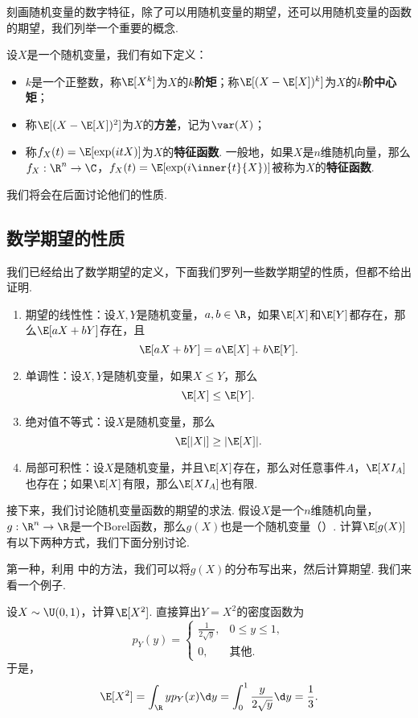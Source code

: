 刻画随机变量的数字特征，除了可以用随机变量的期望，还可以用随机变量的函数的期望，我们列举一个重要的概念. 

\begin{definition}[矩，方差，特征函数]
设$X$是一个随机变量，我们有如下定义：
\begin{itemize}
    \item $k$是一个正整数，称$\E[X^k]$为$X$的\textbf{$k$阶矩}；称$\E[(X-\E[X])^k]$为$X$的\textbf{$k$阶中心矩}；
    \item 称$\E[(X-\E[X])^2]$为$X$的\textbf{方差}，记为$\var(X)$；
    \item 称$f_X(t)=\E[\exp(i tX)]$为$X$的\textbf{特征函数}. 一般地，如果$X$是$n$维随机向量，那么$f_X:\R^n\to\C$，$f_X(t)=\E[\exp(i\inner{t}{X})]$被称为$X$的\textbf{特征函数}. 
\end{itemize}
\end{definition}
我们将会在后面讨论他们的性质. 

\subsection{数学期望的性质}

我们已经给出了数学期望的定义，下面我们罗列一些数学期望的性质，但都不给出证明. 

\begin{proposition}\label{prop:expectation-property}
\begin{enumerate}
\item 期望的线性性：设$X,Y$是随机变量，$a,b\in\R$，如果$\E[X]$和$\E[Y]$都存在，那么$\E[aX+bY]$存在，且
\[\E[aX+bY]=a\E[X]+b\E[Y].\]
\item 单调性：设$X,Y$是随机变量，如果$X\leq Y$，那么
\[\E[X]\leq \E[Y].\]
\item 绝对值不等式：设$X$是随机变量，那么
\[\E[|X|]\geq |\E[X]|.\]
\item 局部可积性：设$X$是随机变量，并且$\E[X]$存在，那么对任意事件$A$，$\E[XI_A]$也存在；如果$\E[X]$有限，那么$\E[XI_A]$也有限. 
\end{enumerate}
\end{proposition}

接下来，我们讨论随机变量函数的期望的求法. 假设$X$是一个$n$维随机向量，$g:\R^n\to\R$是一个Borel函数，那么$g(X)$也是一个随机变量（）. 计算$\E[g(X)]$有以下两种方式，我们下面分别讨论. 

第一种，利用 中的方法，我们可以将$g(X)$的分布写出来，然后计算期望. 我们来看一个例子. 

\begin{example}\label{ex:uniform-square}
设$X\sim\U(0,1)$，计算$\E[X^2]$. 直接算出$Y=X^2$的密度函数为
\[p_Y(y)=\begin{cases}
    \frac{1}{2\sqrt{y}},&0\leq y\leq 1,\\
    0,&\text{其他}.
\end{cases}\]
于是，
\[\E[X^2]=\int_{\R} y p_Y(x)\d y=\int_0^1\frac{y}{2\sqrt{y}}\d y=\frac{1}{3}.\]
\end{example}


